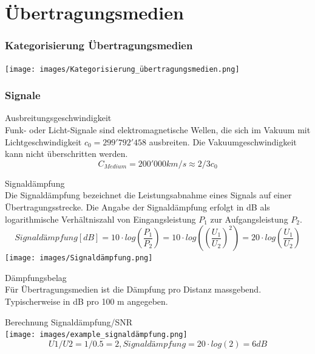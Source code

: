 \section{Übertragungsmedien}
    \subsubsection{Kategorisierung Übertragungsmedien}
    \centering
    \texttt{[image: images/Kategorisierung\_übertragungsmedien.png]}
    
    \subsubsection{Signale}
    \begin{theorem}{Ausbreitungsgeschwindigkeit}\\
        Funk- oder Licht-Signale sind elektromagnetische Wellen, die sich im Vakuum mit Lichtgeschwindigkeit $c_0 = 299'792'458$ ausbreiten. Die Vakuumgeschwindigkeit kann nicht überschritten werden.
        $$C_{Medium} = 200'000 km/s \approx 2/3 c_0$$
    \end{theorem}

    \begin{theorem}{Signaldämpfung}\\
        Die Signaldämpfung bezeichnet die Leistungsabnahme eines Signals auf einer Übertragungsstrecke. Die Angabe der Signaldämpfung erfolgt in dB als logarithmische Verhältniszahl von Eingangsleistung $P_1$ zur Aufgangsleistung $P_2$.
        $$Signaldämpfung[dB] = 10 \cdot log (\frac{P_1}{P_2}) = 10 \cdot log((\frac{U_1}{U_2})^2) = 20 \cdot log(\frac{U_1}{U_2})$$
        \texttt{[image: images/Signaldämpfung.png]}
    \end{theorem}    

    \begin{definition}{Dämpfungsbelag}\\
        Für Übertragungsmedien ist die Dämpfung pro Distanz massgebend. Typischerweise in dB pro 100 m angegeben. \\
    \end{definition}

    \begin{example2}{Berechnung Signaldämpfung/SNR}\\
        \texttt{[image: images/example\_signaldämpfung.png]}
        $$U1/U2 = 1/0.5 = 2, Signaldämpfung = 20 \cdot log(2) = 6dB$$
    \end{example2}


